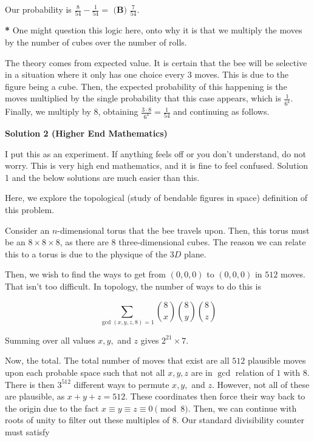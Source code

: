 \begin{enumerate}
 Our probability is $\frac{8}{54} - \frac{1}{54} =$ $\boxed{\textbf{(B) }\frac{7}{54}}$.

 \textbf{*} One might question this logic here, onto why it is that we multiply the moves by the number of cubes over the number of rolls.

 The theory comes from expected value. It is certain that the bee will be selective in a situation where it only has one choice every 3 moves. This is due to the figure being a cube. Then, the expected probability of this happening is the moves multiplied by the single probability that this case appears, which is $\frac{1}{6^4}$. Finally, we multiply by 8, obtaining $\frac{3 \cdot 8}{6^4} = \frac{1}{54}$ and continuing as follows.

 



\textbf{Solution 2 (Higher End Mathematics)}

I put this as an experiment. If anything feels off or you don't understand, do not worry. This is very high end mathematics, and it is fine to feel confused. Solution 1 and the below solutions are much easier than this.

 Here, we explore the topological (study of bendable figures in space) definition of this problem.

 Consider an \( n \)-dimensional torus that the bee travels upon. Then, this torus must be an \( 8 \times 8 \times 8 \), as there are \( 8 \) three-dimensional cubes. The reason we can relate this to a torus is due to the physique of the \( 3D \) plane. 

 Then, we wish to find the ways to get from \( (0,0,0) \) to \( (0,0,0) \) in \( 512 \) moves. That isn't too difficult. In topology, the number of ways to do this is 

 
 \[\sum_{\gcd(x,y,z,8) = 1} \binom{8}{x} \binom{8}{y} \binom{8}{z}\]

 Summing over all values \( x, y, \) and \( z \) gives \( 2^{21} \times 7 \).

 Now, the total. The total number of moves that exist are all \( 512 \) plausible moves upon each probable space such that not all \( x, y, z \) are in \( \gcd \) relation of \( 1 \) with \( 8 \). There is then \( 3^{512} \) different ways to permute \( x, y, \) and \( z \). However, not all of these are plausible, as \( x + y + z = 512 \). These coordinates then force their way back to the origin due to the fact \( x \equiv y \equiv z \equiv 0 \pmod{8} \). Then, we can continue with roots of unity to filter out these multiples of \( 8 \). Our standard divisibility counter must satisfy 


\end{enumerate}
